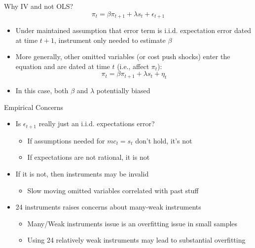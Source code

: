 \documentclass[11pt,aspectratio=169,xcolor={dvipsnames},hyperref={pdftex,pdfpagemode=UseNone,hidelinks,pdfdisplaydoctitle=true},usepdftitle=false]{beamer}
\begin{document}
\begin{frame}{Why IV and not OLS?}
\[ \pi_{t} = \beta \pi_{t+1} + \lambda s_{t} + \epsilon_{t+1} \] \vspace{-15pt}
\begin{itemize}
\item Under maintained assumption that error term is i.i.d. expectation error dated at time $t+1$, instrument only needed to estimate $\beta$
\item More generally, other omitted variables (or cost push shocks) enter the equation and are dated at time $t$ (i.e., affect $\pi_{t}$):
\[ \pi_{t} = \beta \pi_{t+1} + \lambda s_{t} + \eta_{t} \]
\item In this case, both $\beta$ and $\lambda$ potentially biased
\end{itemize}
\end{frame}

\begin{frame}{Empirical Concerns}
\begin{itemize}
\itemsep1em 
\item Is $\epsilon_{t+1}$ really just an i.i.d. expectations error?
\begin{itemize}
\item If assumptions needed for $mc_{t} = s_{t}$ don't hold, it's not
\item If expectations are not rational, it is not
\end{itemize}
\item If it is not, then instruments may be invalid
\begin{itemize}
\item Slow moving omitted variables correlated with past stuff
\end{itemize}
\item 24 instruments raises concerns about many-weak instruments
\begin{itemize}
\item Many/Weak instruments issue is an overfitting issue in small samples
\item Using 24 relatively weak instruments may lead to substantial overfitting
\end{itemize}
\end{itemize}
\end{frame}
\end{document}
